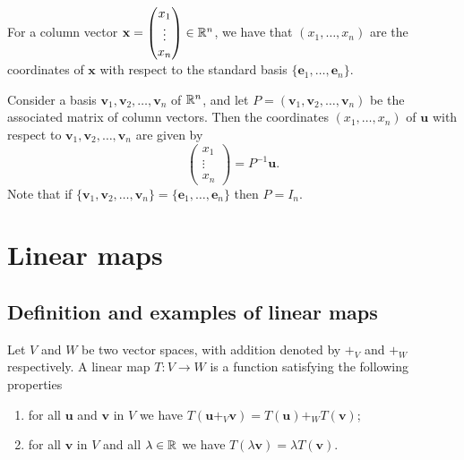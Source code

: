 \documentclass[10pt, a4paper]{article}
\newcommand{\mbf}[1]{\mathbf{#1}}
\begin{document}
For a column vector $\mbf{x} = \begin{pmatrix}
    x_1 \\ \vdots \\ x_n
\end{pmatrix} \in \R ^ n$,
we have that $(x_1, \dotsc, x_n)$ are the coordinates of $\mbf{x}$ with respect to the standard basis $\{\mbf{e}_1, \dotsc, \mbf{e}_n\}$.

\begin{lemma}
    Consider a basis $\mbf{v}_1, \mbf{v}_2, \dotsc, \mbf{v}_n$ of $\mathbb{R} ^ n$,
    and let $P = (\mbf{v}_1, \mbf{v}_2, \dotsc, \mbf{v}_n)$ be the associated matrix of column vectors.
    Then the coordinates $(x_1, \dotsc, x_n)$ of $\mbf{u}$ with respect to $\mbf{v}_1, \mbf{v}_2, \dotsc, \mbf{v}_n$ are given by
    \[
    \begin{pmatrix}
        x_1 \\ \vdots \\ x_n
    \end{pmatrix} = P ^ {-1}\mbf{u}.
    \]
    Note that if $\{\mbf{v}_1, \mbf{v}_2, \dotsc, \mbf{v}_n\} = \{\mbf{e}_1, \dotsc, \mbf{e}_n\}$ then $P = I_n$.
\end{lemma}

\newpage

\section{Linear maps}

\subsection{Definition and examples of linear maps}

\begin{definition}
    Let $V$ and $W$ be two vector spaces,
    with addition denoted by $+_{V}$ and $+_{W}$ respectively.
    A linear map $T : V \rightarrow W$ is a function satisfying the following properties
    \begin{enumerate}[label = (\roman*)]
        \item for all $\mbf{u}$ and $\mbf{v}$ in $V$ we have $T(\mbf{u} +_{V} \mbf{v}) = T(\mbf{u}) +_{W} T(\mbf{v})$;
        \item for all $\mbf{v}$ in $V$ and all $\lambda \in \mathbb{R}$ we have $T(\lambda\mbf{v}) = \lambda T(\mbf{v})$.
    \end{enumerate}
\end{definition}
\end{document}
